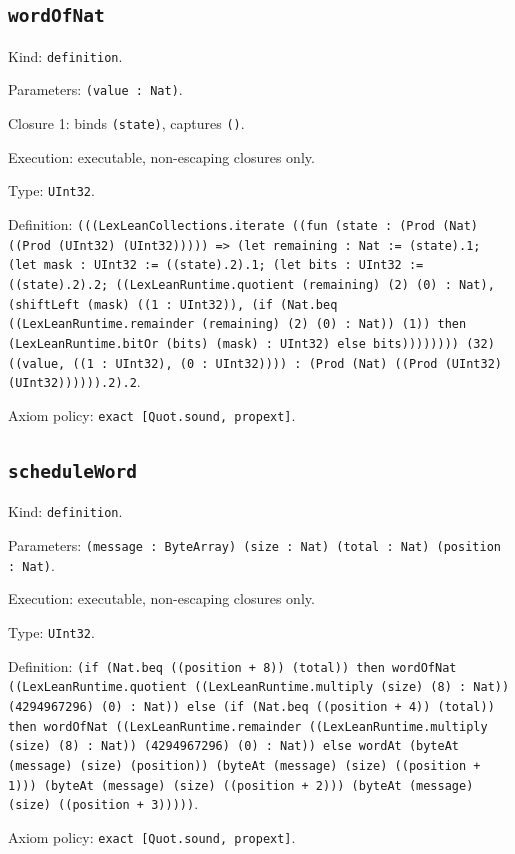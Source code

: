 \documentclass[11pt]{article}
\begin{document}
\subsection*{\texttt{wordOfNat}}
\noindent Kind: \texttt{definition}.\par
\noindent Parameters: \texttt{(value : Nat)}.\par
\noindent Closure 1: binds \texttt{(state)}, captures \texttt{()}.\par
\noindent Execution: executable, non-escaping closures only.\par
\noindent Type: \texttt{UInt32}.\par
\noindent Definition: \texttt{(((LexLeanCollections.iterate ((fun (state : (Prod (Nat) ((Prod (UInt32) (UInt32))))) => (let remaining : Nat := (state).1; (let mask : UInt32 := ((state).2).1; (let bits : UInt32 := ((state).2).2; ((LexLeanRuntime.quotient (remaining) (2) (0) : Nat), (shiftLeft (mask) ((1 : UInt32)), (if (Nat.beq ((LexLeanRuntime.remainder (remaining) (2) (0) : Nat)) (1)) then (LexLeanRuntime.bitOr (bits) (mask) : UInt32) else bits)))))))) (32) ((value, ((1 : UInt32), (0 : UInt32)))) : (Prod (Nat) ((Prod (UInt32) (UInt32)))))).2).2}.\par
\noindent Axiom policy: \texttt{exact [Quot.sound, propext]}.\par
\subsection*{\texttt{scheduleWord}}
\noindent Kind: \texttt{definition}.\par
\noindent Parameters: \texttt{(message : ByteArray) (size : Nat) (total : Nat) (position : Nat)}.\par
\noindent Execution: executable, non-escaping closures only.\par
\noindent Type: \texttt{UInt32}.\par
\noindent Definition: \texttt{(if (Nat.beq ((position + 8)) (total)) then wordOfNat ((LexLeanRuntime.quotient ((LexLeanRuntime.multiply (size) (8) : Nat)) (4294967296) (0) : Nat)) else (if (Nat.beq ((position + 4)) (total)) then wordOfNat ((LexLeanRuntime.remainder ((LexLeanRuntime.multiply (size) (8) : Nat)) (4294967296) (0) : Nat)) else wordAt (byteAt (message) (size) (position)) (byteAt (message) (size) ((position + 1))) (byteAt (message) (size) ((position + 2))) (byteAt (message) (size) ((position + 3)))))}.\par
\noindent Axiom policy: \texttt{exact [Quot.sound, propext]}.\par
\end{document}
